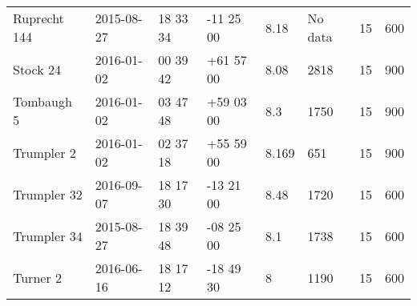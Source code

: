 \documentclass{jaa}
\begin{document}
\begin{table*}[]
\begin{tabular}{llllllll}
Ruprecht 144       & 2015-08-27          & 18 33 34      & -11 25 00      & 8.18       & No data         & 15          & 600           \\
Stock 24        & 2016-01-02          & 00 39 42      & +61 57 00      & 8.08       & 2818          & 15          & 900           \\
Tombaugh 5       & 2016-01-02          & 03 47 48      & +59 03 00      & 8.3       & 1750          & 15          & 900           \\
Trumpler 2       & 2016-01-02          & 02 37 18      & +55 59 00      & 8.169      & 651           & 15          & 900           \\
Trumpler 32       & 2016-09-07          & 18 17 30      & -13 21 00      & 8.48       & 1720          & 15          & 600           \\
Trumpler 34       & 2015-08-27          & 18 39 48      & -08 25 00      & 8.1       & 1738          & 15          & 600           \\
Turner 2         & 2016-06-16          & 18 17 12      & -18 49 30      & 8        & 1190          & 15          & 600           \\
 \hline  
\end{tabular}
\end{table*}
\end{document}
